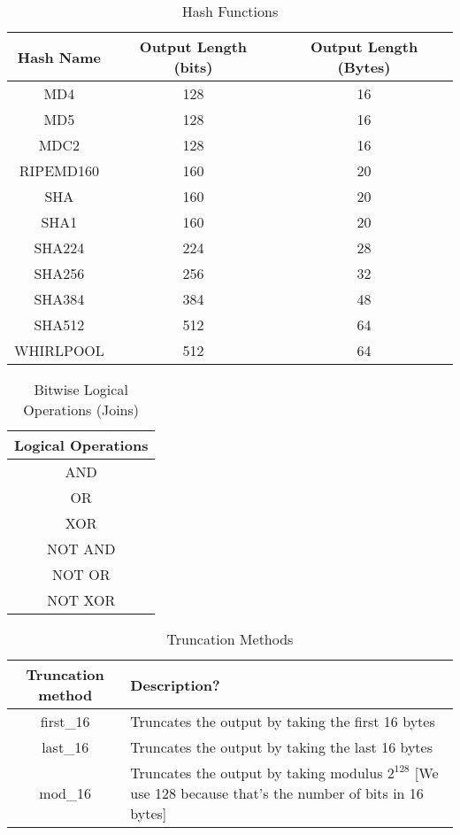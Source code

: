 \documentclass[bsc,frontabs,twoside,singlespacing,parskip,deptreport]{infthesis}     %
\begin{document}
\begin{table}[H]
\begin{center}
\begin{tabular}{|c|c|c|}
\hline
Hash Name & Output Length (bits) & Output Length (Bytes)\\
\hline
MD4 & 128 & 16\\
MD5 & 128 &16\\
MDC2 & 128 & 16\\
RIPEMD160 & 160 & 20\\
SHA & 160 & 20\\
SHA1 & 160 & 20\\
SHA224 & 224 & 28\\
SHA256 & 256 & 32\\
SHA384 & 384 & 48\\
SHA512 & 512 & 64\\
WHIRLPOOL & 512 & 64\\
\hline
\end{tabular}
\caption{Hash Functions}
\end{center}
\end{table}

\begin{table}[H]
\begin{center}
\begin{tabular}{|c|}
\hline
Logical Operations\\
\hline
AND\\
OR \\
XOR\\
NOT AND\\
NOT OR\\
NOT XOR\\
\hline
\end{tabular}
\end{center}
\caption{Bitwise Logical Operations (Joins)}
\end{table}

\begin{table}[H]
\begin{center}
\begin{tabular}{|c|p{10cm}|}
\hline
Truncation method & Description?\\
\hline
first\_16 & Truncates the output by taking the first 16 bytes \\
last\_16 & Truncates the output by taking the last 16 bytes\\
mod\_16 & Truncates the output by taking modulus $2^{128}$ [We use 128 because that's the number of bits in 16 bytes]  \\
\hline
\end{tabular}
\end{center}
\caption{Truncation Methods}
\end{table}
\end{document}
